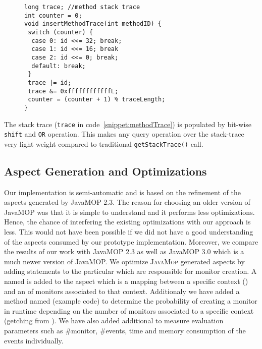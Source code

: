  \begin{figure}[t]
\begin{lstlisting}
long trace; //method stack trace
int counter = 0;
void insertMethodTrace(int methodID) {
 switch (counter) {
  case 0: id <<= 32; break;
  case 1: id <<= 16; break
  case 2: id <<= 0; break;
  default: break;
 }
 trace |= id;
 trace &= 0xffffffffffffL;
 counter = (counter + 1) % traceLength;
}
\end{lstlisting}
\end{figure}
The stack trace (\texttt{trace} in code~\ref{snippet:methodTrace}) is populated
by bit-wise \texttt{shift} and \texttt{OR} operation. This makes any query
operation over the stack-trace very light weight compared to traditional
\texttt{getStackTrace()} call.

\subsection{Aspect Generation and Optimizations}
\label{subsec:aspectGen}

Our implementation is semi-automatic and is based on the refinement of the 
aspects generated by JavaMOP 2.3. The reason for choosing an older version of 
JavaMOP was that it is simple to understand and it performs less optimizations. 
Hence, the chance of interfering the existing optimizations with our approach is 
less. This would not have been possible if we did not have a good understanding 
of the aspects consumed by our prototype implementation. Moreover, we compare 
the results of our work with JavaMOP 2.3 as well as JavaMOP 3.0 which is a much 
newer version of JavaMOP. We optimize \textsc{JavaMop} generated aspects by
adding statements to the particular  which are responsible for
monitor creation. A  named  is added to
the aspect which is a mapping between a specific context () and an
 of monitors associated to that context. Additionaly we have
added a method named  (example code) to determine the
probability of creating a monitor in runtime depending on the number of monitors associated to
a specific context (getching from ). We have also added
additional  to measure evaluation parameters such as \#monitor,
\#events, time and memory consumption of the events individually.


